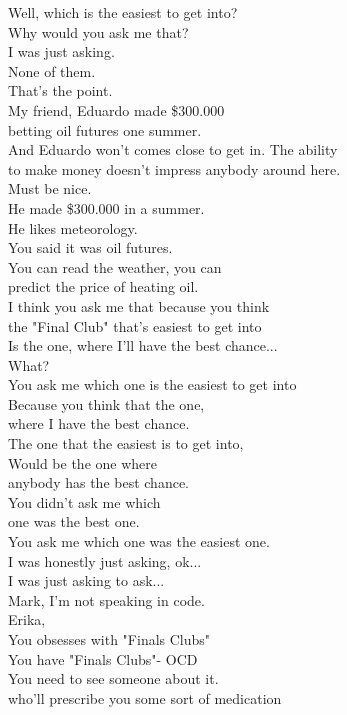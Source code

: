 \documentclass{article}
\begin{document}
\begin{multicols}{3}
Well, which is the easiest to get into?\\
Why would you ask me that?\\
I was just asking.\\
None of them.\\
That's the point.\\
My friend, Eduardo made \$300.000\\
betting oil futures one summer.\\
And Eduardo won't comes close to get in. The ability\\
to make money doesn't impress anybody around here.\\
Must be nice.\\
He made \$300.000 in a summer.\\
He likes meteorology.\\
You said it was oil futures.\\
You can read the weather, you can\\
predict the price of heating oil.\\
I think you ask me that because you think\\
the "Final Club" that's easiest to get into\\
Is the one, where I'll have the best chance...\\
What?\\
You ask me which one is the easiest to get into\\
Because you think that the one,\\
where I have the best chance.\\
The one that the easiest is to get into,\\
Would be the one where\\
anybody has the best chance.\\
You didn't ask me which\\
one was the best one.\\
You ask me which one was the easiest one.\\
I was honestly just asking, ok...\\
I was just asking to ask...\\
Mark, I'm not speaking in code.\\
Erika,\\
You obsesses with "Finals Clubs"\\
You have "Finals Clubs"- OCD\\
You need to see someone about it.\\
who'll prescribe you some sort of medication\\

\end{multicols}
\end{document}

